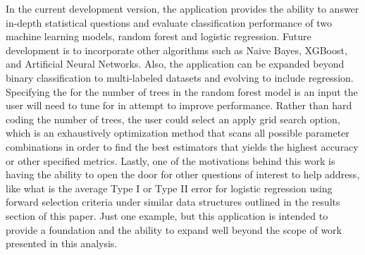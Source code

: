 \documentclass{llncs}
\begin{document}
In the current development version, the application provides the ability to answer in-depth statistical questions and evaluate classification performance of two machine learning models, random forest and logistic regression. Future development is to incorporate other algorithms such as Naive Bayes, XGBoost, and Artificial Neural Networks. Also, the application can be expanded beyond binary classification to multi-labeled datasets and evolving to include regression. Specifying the for the number of trees in the random forest model is an input the user will need to tune for in attempt to improve performance. Rather than hard coding the number of trees, the user could select an apply grid search option, which is an exhaustively optimization method that scans all possible parameter combinations in order to find the best estimators that yields the highest accuracy or other specified metrics. Lastly, one of the motivations behind this work is having the ability to open the door for other questions of interest to help address, like what is the average Type I or Type II error for logistic regression using forward selection criteria under similar data structures outlined in the results section of this paper. Just one example, but this application is intended to provide a foundation and the ability to expand well beyond the scope of work presented in this analysis.
\end{document}
